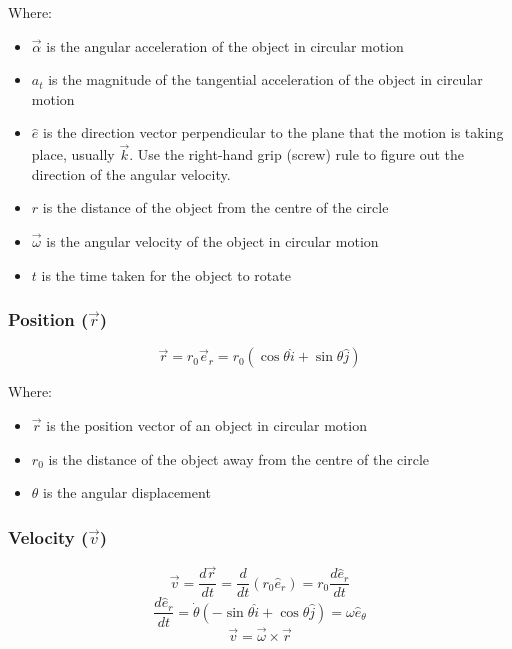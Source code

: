 \documentclass[11pt]{article}
\begin{document}
Where:
\begin{itemize}
\item \(\vec{\alpha}\) is the angular acceleration of the object in circular motion
\item \(a_t\) is the magnitude of the tangential acceleration of the object in circular motion
\item \(\hat{e}\) is the direction vector perpendicular to the plane that the motion is taking place, usually \(\vec{k}\). Use the right-hand grip (screw) rule to figure out the direction of the angular velocity.
\item \(r\) is the distance of the object from the centre of the circle
\item \(\vec{\omega}\) is the angular velocity of the object in circular motion
\item \(t\) is the time taken for the object to rotate
\end{itemize}

\subsubsection{Position (\(\vec{r}\))}
\label{sec:orgb64054d}
\[\vec{r} = r_0 \vec{e}_r = r_0 (\cos \theta \hat{i} + \sin \theta \hat{j})\]

Where:
\begin{itemize}
\item \(\vec{r}\) is the position vector of an object in circular motion
\item \(r_0\) is the distance of the object away from the centre of the circle
\item \(\theta\) is the angular displacement
\end{itemize}

 \newpage

\subsubsection{Velocity (\(\vec{v}\))}
\label{sec:org8500c81}
\[\vec{v} = \frac{d \vec{r}}{dt} = \frac{d}{dt} (r_0 \hat{e}_r) = r_0 \frac{d \hat{e}_r}{dt}\]
\[\frac{d \hat{e}_r}{dt} = \dot{\theta} (- \sin \theta \hat{i} + \cos \theta \hat{j}) = \omega \hat{e}_{\theta}\]
\[\vec{v} = \vec{\omega} \times \vec{r}\]
\end{document}

